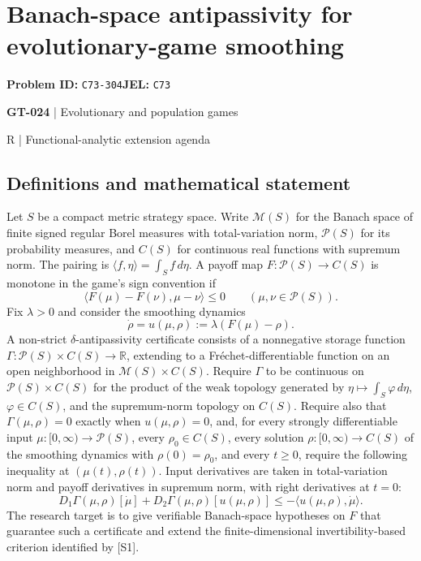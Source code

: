 \documentclass[11pt,a4paper]{article}
\begin{document}
\section*{Banach-space antipassivity for evolutionary-game smoothing}
\textbf{Problem ID:} \texttt{C73-304}\quad \textbf{JEL:} \texttt{C73}\par
\label{problem:OP-0154}
\label{game:GT-024}
{\sffamily\small\color{muted}
{\sffamily\small\color{muted}\textbf{GT-024} | Evolutionary and population games\par R | Functional-analytic extension agenda\par}
\par}
\subsection*{Definitions and mathematical statement}
Let $S$ be a compact metric strategy space. Write $\mathcal M(S)$ for the Banach space of finite signed regular Borel measures with total-variation norm, $\mathcal P(S)$ for its probability measures, and $C(S)$ for continuous real functions with supremum norm. The pairing is $\langle f,\eta\rangle=\int_S f\,d\eta$. A payoff map $F:\mathcal P(S)\to C(S)$ is monotone in the game's sign convention if
\[
 \langle F(\mu)-F(\nu),\mu-\nu\rangle\leq0
 \qquad(\mu,\nu\in\mathcal P(S)).
\]
Fix $\lambda>0$ and consider the smoothing dynamics
\[
 \dot\rho=u(\mu,\rho):=\lambda(F(\mu)-\rho).
\]
A non-strict $\delta$-antipassivity certificate consists of a nonnegative storage function $\Gamma:\mathcal P(S)\times C(S)\to\mathbb R$, extending to a Fr\'echet-differentiable function on an open neighborhood in $\mathcal M(S)\times C(S)$. Require $\Gamma$ to be continuous on $\mathcal P(S)\times C(S)$ for the product of the weak topology generated by $\eta\mapsto\int_S\varphi\,d\eta$, $\varphi\in C(S)$, and the supremum-norm topology on $C(S)$. Require also that $\Gamma(\mu,\rho)=0$ exactly when $u(\mu,\rho)=0$, and, for every strongly differentiable input $\mu:[0,\infty)\to\mathcal P(S)$, every $\rho_0\in C(S)$, every solution $\rho:[0,\infty)\to C(S)$ of the smoothing dynamics with $\rho(0)=\rho_0$, and every $t\geq0$, require the following inequality at $(\mu(t),\rho(t))$. Input derivatives are taken in total-variation norm and payoff derivatives in supremum norm, with right derivatives at $t=0$:
\[
 D_1\Gamma(\mu,\rho)[\dot\mu]+D_2\Gamma(\mu,\rho)[u(\mu,\rho)]
 \leq-\langle u(\mu,\rho),\dot\mu\rangle.
\]
The research target is to give verifiable Banach-space hypotheses on $F$ that guarantee such a certificate and extend the finite-dimensional invertibility-based criterion identified by [S1].
\end{document}
